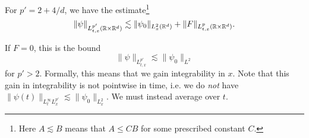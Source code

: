 \begin{theorem}\label{thm:strichartz}
  For $p' = 2 + 4 / d$, we have the estimate\footnote{Here $A \lesssim B$ means that $A \le CB$ for some prescribed constant $C$.}
  \[
    \|\psi\|_{L^{p'}_{t, x}(\mathbb{R} \times \mathbb{R}^d)}
    \lesssim \|\psi_0\|_{L^2_x(\mathbb{R}^d)}
    + \|F\|_{L^{p}_{t, x}(\mathbb{R} \times \mathbb{R}^d)}.
  \]
\end{theorem}

\begin{remark}
  If $F = 0$, this is the bound
  \[
    \|\psi\|_{L^{p'}_{t, x}}
    \lesssim \|\psi_0\|_{L^2}
  \]
  for $p' > 2$. Formally, this means that we gain
  integrability in $x$. Note that this gain in
  integrability is not pointwise in time, i.e.
  we do \emph{not} have $\|\psi(t)\|_{L^\infty_t L^{p'}_x} \lesssim \|\psi_0\|_{L^2_x}$. We must instead average
  over $t$.
\end{remark}

